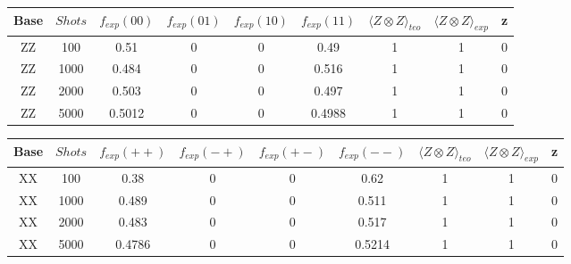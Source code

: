 \documentclass[11pt, a4paper, twocolumn]{article}
\begin{document}
\begin{table}
	
	\begin{tabular}{ccccccccc}
\hline
 Base   &   $Shots$ &   $f_{exp}(00)$ &   $f_{exp}(01)$ &   $f_{exp}(10)$ &   $f_{exp}(11)$ &   $\langle Z \otimes Z \rangle_{teo}$ &   $\langle Z \otimes Z \rangle_{exp}$ &   z \\
\hline
 ZZ     &     100 &        0.51   &             0 &             0 &        0.49   &               1 &               1 &   0 \\
 ZZ     &    1000 &        0.484  &             0 &             0 &        0.516  &               1 &               1 &   0 \\
 ZZ     &    2000 &        0.503  &             0 &             0 &        0.497  &               1 &               1 &   0 \\
 ZZ     &    5000 &        0.5012 &             0 &             0 &        0.4988 &               1 &               1 &   0 \\
\hline
\end{tabular}
	
\begin{tabular}{ccccccccc}
\hline
 Base   &   $Shots$ &   $f_{exp}(++)$ &   $f_{exp}(-+)$ &   $f_{exp}(+-)$ &   $f_{exp}(--)$ &   $\langle Z \otimes Z \rangle_{teo}$ &   $\langle Z \otimes Z \rangle_{exp}$ &   z \\
\hline
 XX     &     100 &        0.38   &             0 &             0 &        0.62   &               1 &               1 &   0 \\
 XX     &    1000 &        0.489  &             0 &             0 &        0.511  &               1 &               1 &   0 \\
 XX     &    2000 &        0.483  &             0 &             0 &        0.517  &               1 &               1 &   0 \\
 XX     &    5000 &        0.4786 &             0 &             0 &        0.5214 &               1 &               1 &   0 \\
\hline
\end{tabular}


\end{table}
\end{document}
